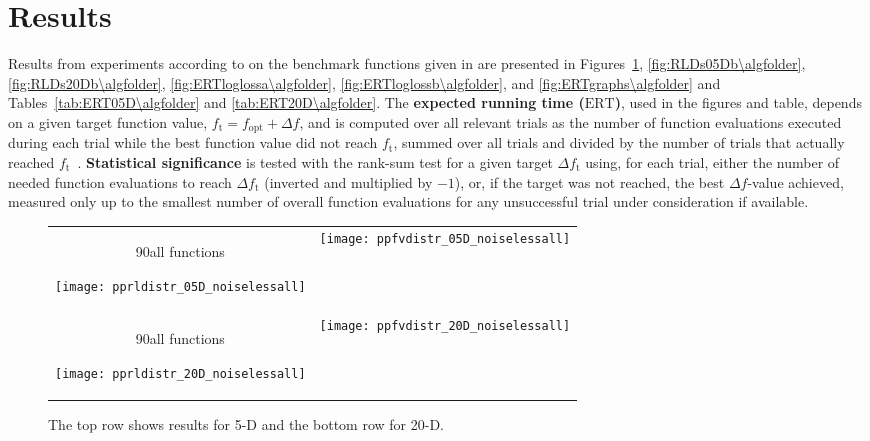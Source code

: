 \documentclass{article}
\newcommand{\ERT}{\ensuremath{\mathrm{ERT}}}
\newcommand{\Df}{\ensuremath{\Delta f}}
\newcommand{\fopt}{\ensuremath{f_\mathrm{opt}}}
\newcommand{\ftarget}{\ensuremath{f_\mathrm{t}}}
\newcommand{\rot}[2][2.5]{
  \hspace*{-3.5\baselineskip}%
  \begin{rotate}{90}\hspace{#1em}#2
  \end{rotate}}
\begin{document}
\section{Results}
Results from experiments according to \cite{hansen2010exp} on the
benchmark functions given in \cite{wp200901_2010,hansen2010fun} are presented
in Figures~\ref{fig:RLDs05Da\algfolder}, \ref{fig:RLDs05Db\algfolder},
\ref{fig:RLDs20Db\algfolder},
\ref{fig:ERTloglossa\algfolder}, \ref{fig:ERTloglossb\algfolder},
and \ref{fig:ERTgraphs\algfolder} and 
Tables~\ref{tab:ERT05D\algfolder} and \ref{tab:ERT20D\algfolder}.
The \textbf{expected running time (\ERT)}, used in the figures and table,
depends on a given target function value, $\ftarget=\fopt+\Df$, and is computed
over all relevant trials as the number of function evaluations executed during
each trial while the best function value did not reach \ftarget, summed over
all trials and divided by the number of trials that actually reached \ftarget\
\cite{hansen2010exp,price1997dev}.
\textbf{Statistical significance} is tested with the rank-sum test for a given
target $\Delta\ftarget$ using, for each trial, either the number of needed
function evaluations to reach $\Delta\ftarget$ (inverted and multiplied by
$-1$), or, if the target was not reached, the best $\Df$-value achieved,
measured only up to the smallest number of overall function evaluations for any
unsuccessful trial under consideration if available.
\begin{figure}[htbp!]
\centering
\begin{tabular}{@{}c@{}c@{}}
\rot[5]{all functions}\texttt{[image: pprldistr\_05D\_noiselessall]} &
\texttt{[image: ppfvdistr\_05D\_noiselessall]}\\
\rot[5]{all functions}\texttt{[image: pprldistr\_20D\_noiselessall]} &
\texttt{[image: ppfvdistr\_20D\_noiselessall]}
\end{tabular}
\caption{\label{fig:RLDs05Da\algfolder} \bbobpprldistrlegend{} The top row shows results for 5-D and the bottom row for 20-D.}
\end{figure}
\end{document}
